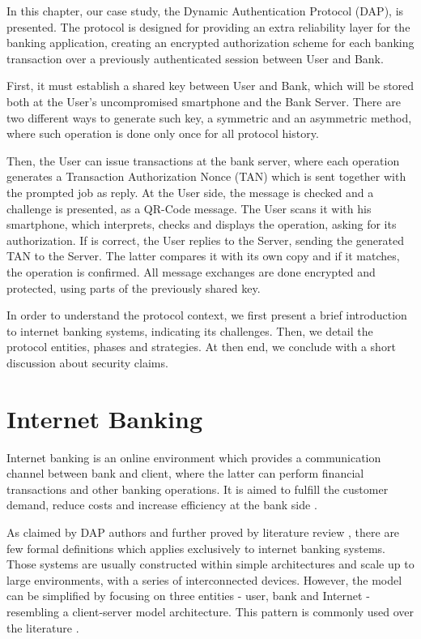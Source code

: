 \label{chap:dap}

In this chapter, our case study, the Dynamic Authentication Protocol (DAP), is presented. The protocol is designed for providing an extra reliability layer for the banking application, creating an encrypted authorization scheme for each banking transaction over a previously authenticated session between User and Bank.

First, it must establish a shared key between User and Bank, which will be stored both at the User's uncompromised smartphone and the Bank Server. There are two different ways to generate such key, a symmetric and an asymmetric method, where such operation is done only once for all protocol history.

Then, the User can issue transactions at the bank server, where each operation generates a Transaction Authorization Nonce (TAN) which is sent together with the prompted job as reply. At the User side, the message is checked and a challenge is presented, as a QR-Code message. The User scans it with his smartphone, which interprets, checks and displays the operation, asking for its authorization. If is correct, the User replies to the Server, sending the generated TAN to the Server. The latter compares it with its own copy and if it matches, the operation is confirmed. All message exchanges are done encrypted and protected, using parts of the previously shared key.

In order to understand the protocol context, we first present a brief introduction to internet banking systems, indicating its challenges. Then, we detail the protocol entities, phases and strategies. At then end, we conclude with a short discussion about security claims.










\section{Internet Banking}
Internet banking is an online environment which provides a communication channel between bank and client, where the latter can perform financial transactions and other banking operations. It is aimed to fulfill the customer demand, reduce costs and increase efficiency at the bank side \cite{banking-security}.

As claimed by DAP authors \cite[p.8]{bbcode-thesis} and further proved by literature review \cite{banking-security}, there are few formal definitions which applies exclusively to internet banking systems. Those systems are usually constructed within simple architectures and scale up to large environments, with a series of interconnected devices. However, the model can be simplified by focusing on three entities - user, bank and Internet - resembling a client-server model architecture. This pattern is commonly used over the literature \cite{banking-security}.

